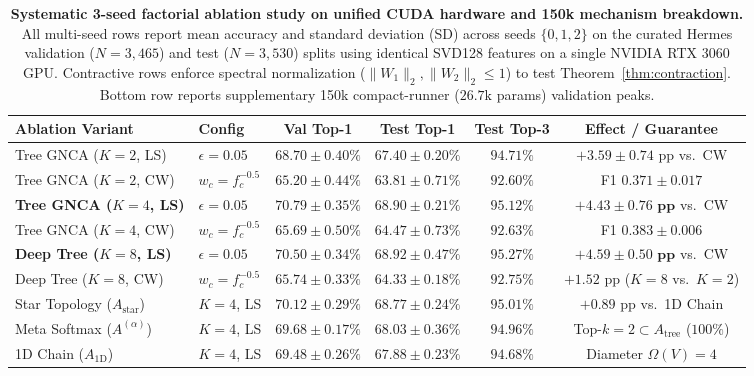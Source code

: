 \documentclass[10pt,twocolumn,letterpaper]{article}
\begin{document}
\begin{table}[tbp]
\centering
\small
\setlength{\tabcolsep}{2.5pt}
\caption{\textbf{Systematic 3-seed factorial ablation study on unified CUDA hardware and 150k mechanism breakdown.} All multi-seed rows report mean accuracy and standard deviation (SD) across seeds $\{0, 1, 2\}$ on the curated Hermes validation ($N{=}3{,}465$) and test ($N{=}3{,}530$) splits using identical SVD128 features on a single NVIDIA RTX 3060 GPU. Contractive rows enforce spectral normalization ($\|W_1\|_2, \|W_2\|_2 \le 1$) to test Theorem~\ref{thm:contraction}. Bottom row reports supplementary 150k compact-runner ($26.7\text{k}$ params) validation peaks.}
\label{tab:ablations}
\vspace{6pt}
\begin{tabular*}{\textwidth}{@{\extracolsep{\fill}}llcccc@{}}
\toprule
\textbf{Ablation Variant} & \textbf{Config} & \textbf{Val Top-1} & \textbf{Test Top-1} & \textbf{Test Top-3} & \textbf{Effect / Guarantee} \\
\midrule
Tree GNCA ($K{=}2$, LS) & $\epsilon{=}0.05$ & $68.70 \pm 0.40\%$ & $67.40 \pm 0.20\%$ & $94.71\%$ & $+3.59 \pm 0.74\text{ pp}$ vs.\ CW \\
Tree GNCA ($K{=}2$, CW) & $w_c{=}f_c^{-0.5}$ & $65.20 \pm 0.44\%$ & $63.81 \pm 0.71\%$ & $92.60\%$ & F1 $0.371 \pm 0.017$ \\
\textbf{Tree GNCA ($K{=}4$, LS)} & $\epsilon{=}0.05$ & $\mathbf{70.79 \pm 0.35\%}$ & $\mathbf{68.90 \pm 0.21\%}$ & $95.12\%$ & $\mathbf{+4.43 \pm 0.76\text{ pp}}$ vs.\ CW \\
Tree GNCA ($K{=}4$, CW) & $w_c{=}f_c^{-0.5}$ & $65.69 \pm 0.50\%$ & $64.47 \pm 0.73\%$ & $92.63\%$ & F1 $0.383 \pm 0.006$ \\
\textbf{Deep Tree ($K{=}8$, LS)} & $\epsilon{=}0.05$ & $70.50 \pm 0.34\%$ & $\mathbf{68.92 \pm 0.47\%}$ & $\mathbf{95.27\%}$ & $\mathbf{+4.59 \pm 0.50\text{ pp}}$ vs.\ CW \\
Deep Tree ($K{=}8$, CW) & $w_c{=}f_c^{-0.5}$ & $65.74 \pm 0.33\%$ & $64.33 \pm 0.18\%$ & $92.75\%$ & $+1.52\text{ pp}$ ($K{=}8$ vs.\ $K{=}2$) \\
\midrule
Star Topology ($A_{\text{star}}$) & $K{=}4$, LS & $70.12 \pm 0.29\%$ & $68.77 \pm 0.24\%$ & $95.01\%$ & $+0.89\text{ pp}$ vs.\ 1D Chain \\
Meta Softmax ($A^{(\alpha)}$) & $K{=}4$, LS & $69.68 \pm 0.17\%$ & $68.03 \pm 0.36\%$ & $94.96\%$ & Top-$k{=}2 \subset A_{\text{tree}}$ ($100\%$) \\
1D Chain ($A_{\text{1D}}$) & $K{=}4$, LS & $69.48 \pm 0.26\%$ & $67.88 \pm 0.23\%$ & $94.68\%$ & Diameter $\Omega(V){=}4$ \\

\end{tabular*}
\end{table}
\end{document}
